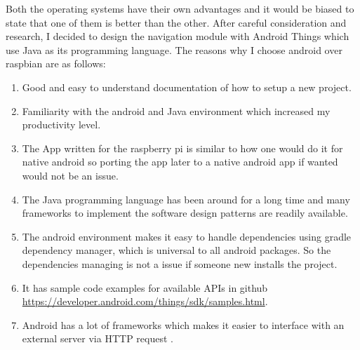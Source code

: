         \newpage 
        \par
            Both the operating systems have their own advantages and it would be biased to state that
            one of them is better than the other. After careful consideration and research, I
            decided to design the navigation module with Android Things which use Java as its
            programming language. The reasons why I choose android over raspbian are as follows:
            \begin{enumerate}
                \item 
                    Good and easy to understand documentation of how to setup 
                    a new project.
                \item 
                    Familiarity with the android and Java environment which increased my
                    productivity level.  
                \item 
                    The App written for the raspberry pi is similar to how one would
                    do it for native android so porting the app later to a native android
                    app if wanted would not be an issue. 
                \item 
                    The Java programming language has been around for a long time and many
                    frameworks to implement the software design patterns are readily 
                    available.
                \item 
                    The android environment makes it easy to handle dependencies using gradle
                    dependency manager, which is universal to all android packages. So the 
                    dependencies managing is not a issue if someone new installs the project.  
                \item
                    It has sample code examples for available APIs in github 
                    \url{https://developer.android.com/things/sdk/samples.html}. 
                \item
                    Android has a lot of frameworks which makes it easier to interface with an
                    external server via HTTP request \cite{http}.
            \end{enumerate}




